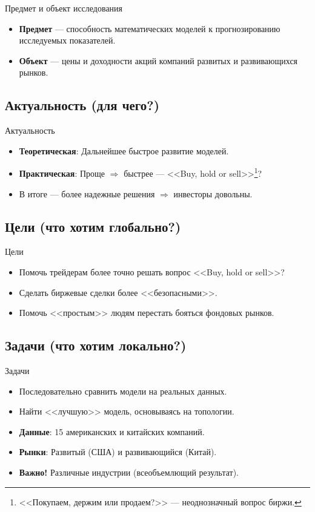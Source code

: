 \documentclass[11pt, aspectratio= 169]{beamer}
\begin{document}
	\begin{frame}{Предмет и объект исследования}
		\Large
		\begin{itemize}
			\item \textbf{Предмет} --- способность математических моделей к прогнозированию исследуемых показателей.
			\item \textbf{Объект} --- цены и доходности акций компаний развитых и развивающихся рынков.
		\end{itemize}
	\end{frame}
	
	\subsection{Актуальность (для чего?)}
	\begin{frame}{Актуальность}
		\Large
		\begin{itemize}
			\item \textbf{Теоретическая}: Дальнейшее быстрое развитие моделей.
			\item \textbf{Практическая}: Проще $\Rightarrow$ быстрее --- <<Buy, hold or sell>>\footnote{<<Покупаем, держим или продаем?>> --- неоднозначный вопрос биржи.}?
			\item[] В итоге --- более надежные решения $\Rightarrow$ инвесторы довольны.
		\end{itemize}
	\end{frame}
	
	\subsection{Цели (что хотим глобально?)}
	\begin{frame}{Цели}
		\Large
		\begin{itemize}
			\item Помочь трейдерам более точно решать вопрос <<Buy, hold or sell>>?
			\item Сделать биржевые сделки более <<безопасными>>.
			\item Помочь <<простым>> людям перестать бояться фондовых рынков.
		\end{itemize}
	\end{frame}
	
	\subsection{Задачи (что хотим локально?)}
	\begin{frame}{Задачи}
		\Large
		\begin{itemize}
			\item Последовательно сравнить модели на реальных данных.
			\item Найти <<лучшую>> модель, основываясь на топологии.
			\item \textbf{Данные}: 15 американских и китайских компаний.
			\item[] \textbf{Рынки}: Развитый (США) и развивающийся (Китай).
			\item[] \textbf{Важно!} Различные индустрии (всеобъемлющий результат). 
		\end{itemize}
	\end{frame}
	
\end{document}
